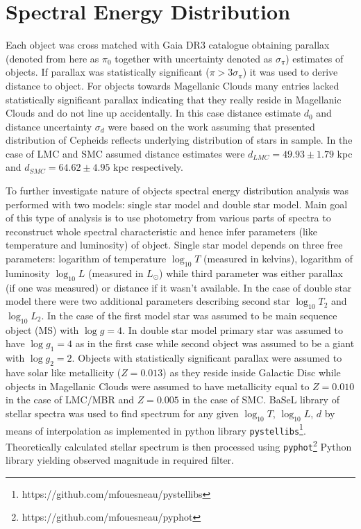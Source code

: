 \documentclass{pracalicmgr}
\begin{document}
\section{Spectral Energy Distribution}
Each object was cross matched  with Gaia DR3 catalogue obtaining parallax (denoted from here as $\pi_0$ together with uncertainty denoted as $\sigma_{\pi}$) estimates of objects. If parallax was statistically significant ($\pi>3\sigma_{\pi}$)
it was used to derive distance to object. For objects towards Magellanic Clouds many entries lacked statistically significant parallax indicating that they really reside in Magellanic Clouds
and do not line up accidentally.
In this case distance estimate $d_0$ and distance uncertainty $\sigma_d$ were based on the work \citep{jacyszyn-dobrzeniecka_ogle-ing_2016} assuming that presented distribution 
of Cepheids reflects underlying distribution of stars in sample.
In the case of LMC and SMC assumed distance estimates were  $d_{LMC}=49.93\pm1.79$ kpc and  $d_{SMC}=64.62\pm4.95$ kpc respectively. 

To further investigate nature of objects spectral energy distribution analysis was 
performed with two models: single star model and double star model. Main goal of this type of analysis is to use photometry from various parts of spectra to
reconstruct whole spectral characteristic and hence infer parameters (like temperature and luminosity) of object.
Single star model depends on three free parameters: logarithm of temperature $\log_{10}T$ (measured in kelvins), logarithm of luminosity $\log_{10} L$ (measured in $L_{\odot}$) while third 
parameter was either parallax (if one was measured) or distance if it wasn't available. In the case of double star model there were two additional parameters describing 
second star $\log_{10} T_2$ and $\log_{10} L_2$. In the case of the first model star was assumed to be main sequence object (MS) with $\log{g}=4$. In double star model primary star 
was assumed to have $\log{g_1}=4$ as in the first case while second object was assumed to be a giant with $\log{g_2}=2$. Objects with statistically significant parallax were assumed to have 
solar like metallicity ($Z=0.013$) as they reside inside Galactic Disc while objects in Magellanic Clouds 
were assumed to have metallicity equal to $Z=0.010$ in the case of LMC/MBR and $Z=0.005$ in the case of SMC.
BaSeL library of stellar spectra \citep{lejeune_standard_1998} was used to find spectrum for any given $\log_{10}{T}$, $\log_{10} L$, $d$ 
by means of interpolation as implemented in python library
\texttt{pystellibs}\footnote{https://github.com/mfouesneau/pystellibs}.
Theoretically calculated stellar spectrum is then processed using \texttt{pyphot}\footnote{https://github.com/mfouesneau/pyphot} 
Python library yielding observed magnitude in required filter.
\end{document}
